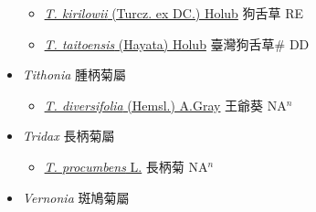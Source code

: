 \begin{itemize}
  \begin{itemize}
        \item[] \href{http://www.theplantlist.org/tpl1.1/search?q=Tephroseris+kirilowii}{\textit{T. kirilowii} (Turcz. ex DC.) Holub}   狗舌草 RE
        \item[] \href{http://www.theplantlist.org/tpl1.1/search?q=Tephroseris+taitoensis}{\textit{T. taitoensis} (Hayata) Holub}   臺灣狗舌草\# DD
  \end{itemize}
 \item[] \textit{Tithonia} 腫柄菊屬
                    
  \begin{itemize}
        \item[] \href{http://www.theplantlist.org/tpl1.1/search?q=Tithonia+diversifolia}{\textit{T. diversifolia} (Hemsl.) A.Gray}   王爺葵 NA$^n$
  \end{itemize}
 \item[] \textit{Tridax} 長柄菊屬
                    
  \begin{itemize}
        \item[] \href{http://www.theplantlist.org/tpl1.1/search?q=Tridax+procumbens}{\textit{T. procumbens} L.}   長柄菊 NA$^n$
  \end{itemize}
 \item[] \textit{Vernonia} 斑鳩菊屬
                    

\end{itemize}
